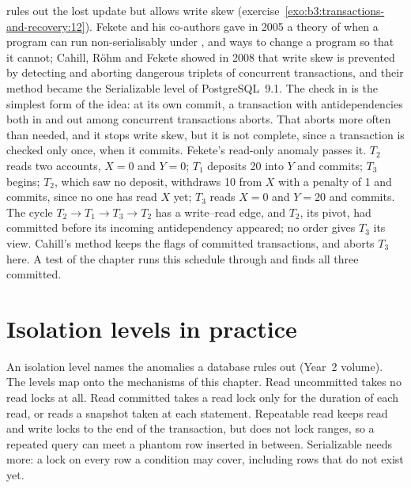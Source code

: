  rules out the lost update but allows write skew (exercise~\ref{exo:b3:transactions-and-recovery:12}). Fekete and his co-authors gave in 2005 a theory of when a program can run non-serialisably under , and ways to change a program so that it cannot; Cahill, Röhm and Fekete showed in 2008 that write skew is prevented by detecting and aborting dangerous triplets of concurrent transactions, and their method became the Serializable level of PostgreSQL~9.1. %
The check in  is the simplest form of the idea: at its own commit, a transaction with antidependencies both in and out among concurrent transactions aborts. That aborts more often than needed, and it stops write skew, but it is not complete, since a transaction is checked only once, when it commits. Fekete's read-only anomaly passes it. $T_2$ reads two accounts, $X = 0$ and $Y = 0$; $T_1$ deposits 20 into $Y$ and commits; $T_3$ begins; $T_2$, which saw no deposit, withdraws 10 from $X$ with a penalty of 1 and commits, since no one has read $X$ yet; $T_3$ reads $X = 0$ and $Y = 20$ and commits. The cycle $T_2 \to T_1 \to T_3 \to T_2$ has a write--read edge, and $T_2$, its pivot, had committed before its incoming antidependency appeared; no  order gives $T_3$ its view. Cahill's method keeps the flags of committed transactions, and aborts $T_3$ here. A test of the chapter runs this schedule through  and finds all three committed.

\section{Isolation levels in practice}\label{sec:b3:transactions-and-recovery:isolation}

An isolation level names the anomalies a database rules out (Year~2 volume). The levels map onto the mechanisms of this chapter. Read uncommitted takes no read locks at all. Read committed takes a read lock only for the duration of each read, or reads a snapshot taken at each statement. Repeatable read keeps read and write locks to the end of the transaction, but does not lock ranges, so a repeated query can meet a phantom row inserted in between. %
Serializable needs more: a lock on every row a condition may cover, including rows that do not exist yet.

